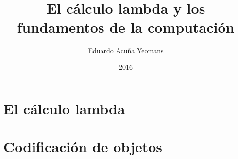 \documentclass[10pt,letterpaper,twoside,openright]{book}
\theoremstyle{plain}%
\theoremstyle{definition}
\theoremstyle{remark}
\begin{document}
\title{El cálculo lambda y los fundamentos de la computación}
\author{Eduardo Acuña Yeomans}
\date{2016}

\maketitle

\frontmatter
\tableofcontents

\mainmatter
\chapter{El cálculo lambda}


\chapter{Codificación de objetos}


\appendix

\nocite{*}


\end{document}
